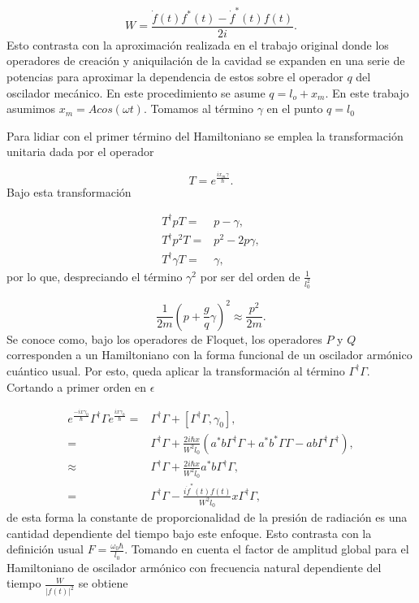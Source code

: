 \documentclass[10pt,a4paper]{report}
\begin{document}
\begin{equation}
W= \frac{\dot{f}(t)f^*(t)-\dot{f}^*(t)f(t)}{2i}.
\end{equation}  Esto contrasta con la aproximación realizada en el trabajo original donde los operadores de creación y aniquilación de la cavidad se expanden en una serie de potencias para aproximar la dependencia de estos sobre el operador $q$ del oscilador mecánico. En este procedimiento se asume $q = l_o + x_m$. En este trabajo asumimos $x_m = Acos(\omega t)$. Tomamos al término $\gamma$ en el punto $q=l_0$

Para lidiar con el primer término del Hamiltoniano se emplea la transformación unitaria dada por el operador

\begin{equation}
T = e^\frac{i x_m \gamma}{\hbar}.
\end{equation} Bajo esta transformación 

\begin{align*}
T^\dagger p T =& p - \gamma, \\
T^\dagger p^2 T =& p^2 -2p\gamma, \\
T^\dagger \gamma T =& \gamma,
\end{align*} por lo que, despreciando el término $\gamma^2$ por ser del orden de $\frac{1}{l_0^2}$

\begin{equation}
\frac{1}{2m}(p + \frac{g}{q} \gamma)^2 \approx \frac{p^2}{2m}.
\end{equation} Se conoce como, bajo los operadores de Floquet, los operadores $P$ y $Q$ corresponden a un Hamiltoniano con la forma funcional de un oscilador armónico cuántico usual. Por esto, queda aplicar la transformación al término $\Gamma^\dagger \Gamma$. Cortando a primer orden en $\epsilon$

\begin{align*}
e^{\frac{-ix\gamma_0}{\hbar}}\Gamma^\dagger \Gamma e^{\frac{ix\gamma_0}{\hbar}} =& \Gamma^\dagger \Gamma + [\Gamma^\dagger \Gamma, \gamma_0], \\
=& \Gamma^\dagger \Gamma + \frac{2i\hbar x}{W^2 l_0}(a^*b \Gamma^\dagger \Gamma + a^*b^* \Gamma \Gamma -ab\Gamma^\dagger \Gamma^\dagger),\\
\approx & \Gamma^\dagger \Gamma + \frac{2i\hbar x}{W^2 l_0} a^*b \Gamma^\dagger \Gamma, \\
=& \Gamma^\dagger \Gamma - \frac{i \dot{f}^*(t)f(t) }{W^2 l_0} x  \Gamma^\dagger \Gamma,
\end{align*} de esta forma la constante de proporcionalidad de la presión de radiación es una cantidad dependiente del tiempo bajo este enfoque. Esto contrasta con la definición usual $F= \frac{\omega_0 \hbar}{l_0}$. Tomando en cuenta el factor de amplitud global para el Hamiltoniano de oscilador armónico con frecuencia natural dependiente del tiempo $\frac{W}{|f(t)|^2}$ se obtiene
\end{document}

